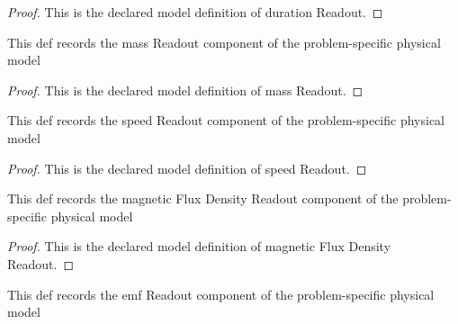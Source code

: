 \begin{proof}
  This is the declared model definition of duration Readout.
\end{proof}
\begin{definition}
  \label{def:physics:phyx-mini-0976:phyxminiproblems-problemphyxmini0976-massreadout}
  This def records the mass Readout component of the problem-specific physical model
\end{definition}
\begin{proof}
  This is the declared model definition of mass Readout.
\end{proof}
\begin{definition}
  \label{def:physics:phyx-mini-0976:phyxminiproblems-problemphyxmini0976-speedreadout}
  This def records the speed Readout component of the problem-specific physical model
\end{definition}
\begin{proof}
  This is the declared model definition of speed Readout.
\end{proof}
\begin{definition}
  \label{def:physics:phyx-mini-0976:phyxminiproblems-problemphyxmini0976-magneticfluxdensityreadout}
  This def records the magnetic Flux Density Readout component of the problem-specific physical model
\end{definition}
\begin{proof}
  This is the declared model definition of magnetic Flux Density Readout.
\end{proof}
\begin{definition}
  \label{def:physics:phyx-mini-0976:phyxminiproblems-problemphyxmini0976-emfreadout}
  This def records the emf Readout component of the problem-specific physical model
\end{definition}
